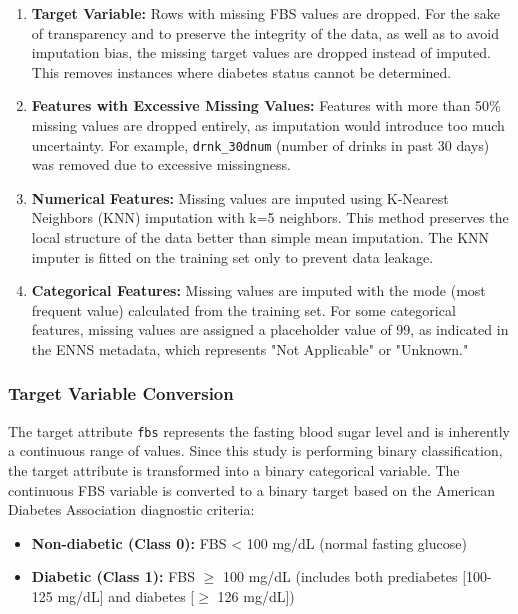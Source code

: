 \begin{enumerate}
    \item \textbf{Target Variable:} Rows with missing FBS values are dropped. For the sake of transparency and to preserve the integrity of the data, as well as to avoid imputation bias, the missing target values are dropped instead of imputed. This removes instances where diabetes status cannot be determined.
    \item \textbf{Features with Excessive Missing Values:} Features with more than 50\% missing values are dropped entirely, as imputation would introduce too much uncertainty. For example, \texttt{drnk\_30dnum} (number of drinks in past 30 days) was removed due to excessive missingness.
    \item \textbf{Numerical Features:} Missing values are imputed using K-Nearest Neighbors (KNN) imputation with k=5 neighbors. This method preserves the local structure of the data better than simple mean imputation. The KNN imputer is fitted on the training set only to prevent data leakage.
    \item \textbf{Categorical Features:} Missing values are imputed with the mode (most frequent value) calculated from the training set. For some categorical features, missing values are assigned a placeholder value of 99, as indicated in the ENNS metadata, which represents "Not Applicable" or "Unknown."
\end{enumerate}

\subsubsection{Target Variable Conversion}

The target attribute \texttt{fbs} represents the fasting blood sugar level and is inherently a continuous range of values. Since this study is performing binary classification, the target attribute is transformed into a binary categorical variable. The continuous FBS variable is converted to a binary target based on the American Diabetes Association diagnostic criteria:

\begin{itemize}
    \item \textbf{Non-diabetic (Class 0):} FBS < 100 mg/dL (normal fasting glucose)
    \item \textbf{Diabetic (Class 1):} FBS $\geq$ 100 mg/dL (includes both prediabetes [100-125 mg/dL] and diabetes [$\geq$ 126 mg/dL])
\end{itemize}

